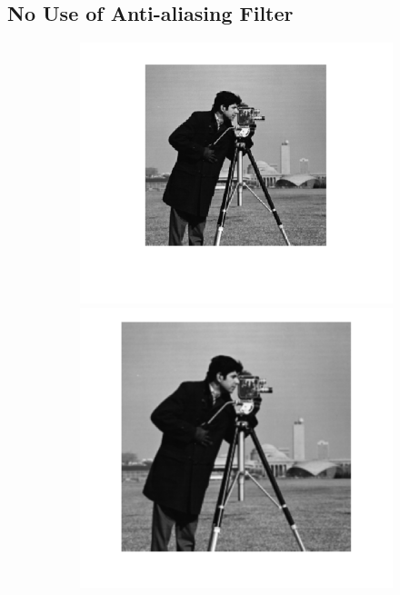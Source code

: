 \documentclass{article}
\begin{document}
\subsection*{No Use of Anti-aliasing Filter}
\begin{figure}[h!]
	\centering
	\begin{subfigure}[t]{0.3\textwidth}
		\centering
		\includegraphics[width=\linewidth]{./output_images/DOWN_no_anti-alias_bilinear_scale_0_500000.png}
		\includegraphics[width=\linewidth]{./output_images/UP_no_anti-alias_bilinear_scale_0_500000.png}

\end{subfigure}
\end{figure}
\end{document}
